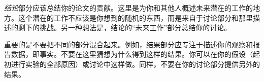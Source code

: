 
\emph{结论}部分应该总结你的论文的贡献。这里是为你和其他人概述未来潜在的工作的地方。这个潜在的工作不应该是你想到的随机的东西，而是来自于讨论部分和那里描述的剩下的挑战。另一种想法是，结论的“未来工作”部分总结你的讨论。


重要的是不要把不同的部分混合起来。例如，结果部分应专注于描述你的观察和报告数据，即事实。不要在这里猜想为什么得到这样的结果。你可以在你的假设（起初进行实验的全部原因）或讨论中这样做。同样，不要在你的讨论部分提供另外的结果。


